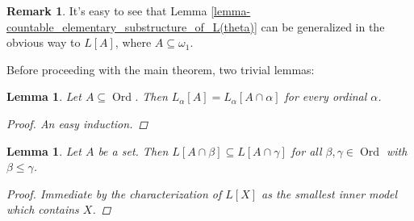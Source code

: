 \documentclass[11pt,a4paper]{report}
\newtheorem{lemma}[theorem]{Lemma}
\theoremstyle{definition}
\newtheorem*{remark}{Remark}
\theoremstyle{num.custom-title}
\theoremstyle{custom-title}
\DeclareMathOperator{\Ord}{\text{Ord}}
\DeclareMathOperator{\sse}{\subseteq}
\begin{document}
\begin{remark}
It's easy to see that Lemma \ref{lemma-countable_elementary_substructure_of_L(theta)} can be generalized in the obvious way to $L[A]$, where $A \sse \omega_1$.
\end{remark}

Before proceeding with the main theorem, two trivial lemmas:

\begin{lemma}\label{lemma-constructibility_relative_to_initial_segment}
Let $A \sse \Ord$. Then $L_\alpha[A] = L_\alpha [A \cap \alpha]$ for every ordinal $\alpha$.
\begin{proof}
An easy induction.
\end{proof}
\end{lemma}

\begin{lemma}\label{lemma-constructibility_relative_to_different_sets}
Let $A$ be a set. 
Then $L[A \cap \beta] \sse L[A \cap \gamma]$ for all $\beta, \gamma \in \Ord$ with $\beta \leq \gamma$.
\begin{proof}
Immediate by the characterization of $L[X]$ as the smallest inner model which contains $X$.
\end{proof}
\end{lemma}
\end{document}
